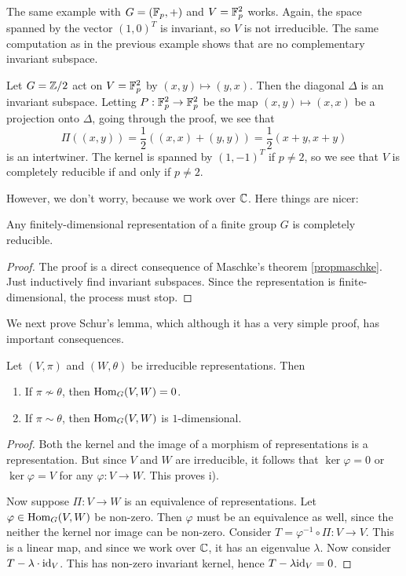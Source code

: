 \documentclass[11pt, english]{article}
\begin{document}
\begin{example}
 The same example with $G=(\mathbb{F}_p, +)$ and $V=\mathbb{F}_p^2$ works. Again, the space spanned by the vector $(1,0)^T$ is invariant, so $V$ is not irreducible. The same computation as in the previous example shows that are no complementary invariant subspace.
\end{example}

\begin{example}
Let $G=\mathbb{Z}/2$ act on $V=\mathbb{F}_p^2$ by $(x,y) \mapsto (y,x)$. Then the diagonal $\Delta$ is an invariant subspace. Letting $P:\mathbb{F}_p^2 \to \mathbb{F}_p^2$ be the map $(x,y) \mapsto (x,x)$ be a projection onto $\Delta$, going through the proof, we see that 
$$
\Pi((x,y)) = \frac 12 \left( (x,x) + (y,y) \right) = \frac 12 \left(x+y, x+y \right)
$$
is an intertwiner. The kernel is spanned by $(1,-1)^T$ if $p \neq 2$, so we see that $V$ is completely reducible if and only if $p \neq 2$. 
\end{example}

However, we don't worry, because we work over $\mathbb{C}$. Here things are nicer:

\begin{thm}
Any finitely-dimensional representation of a finite group $G$ is completely reducible.
\end{thm}
\begin{proof}
The proof is a direct consequence of Maschke's theorem \eqref{propmaschke}.  Just inductively find invariant subspaces. Since the representation is finite-dimensional, the process must stop.
\end{proof}

We next prove Schur's lemma, which although it has a very simple proof, has important consequences.

\begin{prop}
Let $(V,\pi)$ and $(W,\theta)$ be irreducible representations. Then
\begin{enumerate}
\item If $\pi \not \sim \theta$, then $\operatorname{Hom}_G(V,W)=0$.
\item If $\pi \sim \theta$, then $\operatorname{Hom}_G(V,W)$ is $1$-dimensional. 
\end{enumerate}
\end{prop}
\begin{proof}
Both the kernel and the image of a morphism of representations is a representation. But since $V$ and $W$ are irreducible, it follows that $\ker \varphi = 0$ or $\ker \varphi  = V$ for any $\varphi:V \to W$. This proves i). 

Now suppose $\Pi:V \to W$ is an equivalence of representations. Let $\varphi \in \operatorname{Hom}_G(V,W)$ be non-zero. Then $\varphi$ must be an equivalence as well, since the neither the kernel nor image can be non-zero. Consider $T=\varphi^{-1} \circ \Pi: V \to V$. This is a linear map, and since we work over $\mathbb{C}$, it has an eigenvalue $\lambda$. Now consider $T-\lambda \cdot \text{id}_V$. This has non-zero invariant kernel, hence $T-\lambda \text{id}_V=0$. 
\end{proof}
\end{document}
